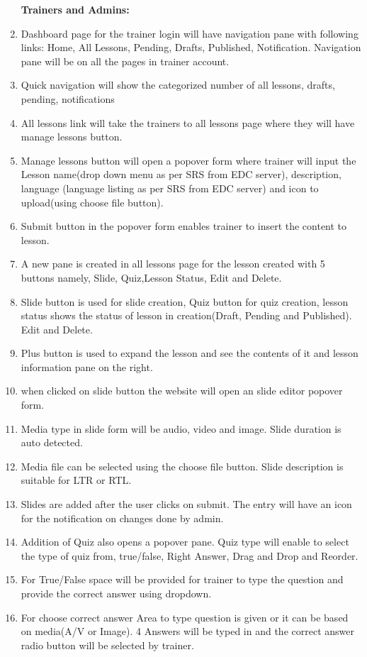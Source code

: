 \documentclass{report}
\begin{document}
\begin{enumerate}
    \textbf{Trainers and Admins:}
    \item Dashboard page for the trainer login will have navigation pane with following links: Home, All Lessons, Pending, Drafts, Published, Notification. Navigation pane will be on all the pages in trainer account.
    \item Quick navigation will show the categorized number of all lessons, drafts, pending, notifications
    \item All lessons link will take the trainers to all lessons page where they will have manage lessons button.
    \item Manage lessons button will open a popover form where trainer will input the Lesson name(drop down menu as per SRS from EDC server), description, language (language listing as per SRS from EDC server) and icon to upload(using choose file button).
    \item Submit button in the popover form enables trainer to insert the content to lesson.
    \item A new pane is created in all lessons page for the lesson created with 5 buttons namely, Slide, Quiz,Lesson Status, Edit and Delete.
    \item Slide button is used for slide creation, Quiz button for quiz creation, lesson status shows the status of lesson in creation(Draft, Pending and Published). Edit and Delete.
    \item Plus button is used to expand the lesson and see the contents of it and lesson information pane on the right.
    \item when clicked on slide button the website will open an slide editor popover form.
    \item Media type in slide form will be audio, video and image. Slide duration is auto detected.
    \item Media file can be selected using the choose file button. Slide description is suitable for LTR or RTL.
    \item Slides are added after the user clicks on submit. The entry will have an icon for the notification on changes done by admin.
    \item Addition of Quiz also opens a popover pane. Quiz type will enable to select the type of quiz from, true/false, Right Answer, Drag and Drop and Reorder.
    \item For True/False space will be provided for trainer to type the question and provide the correct answer using dropdown.
    \item For choose correct answer Area to type question is given or it can be based on media(A/V or Image). 4 Answers will be typed in and the correct answer radio button will be selected by trainer.

\end{enumerate}
\end{document}
